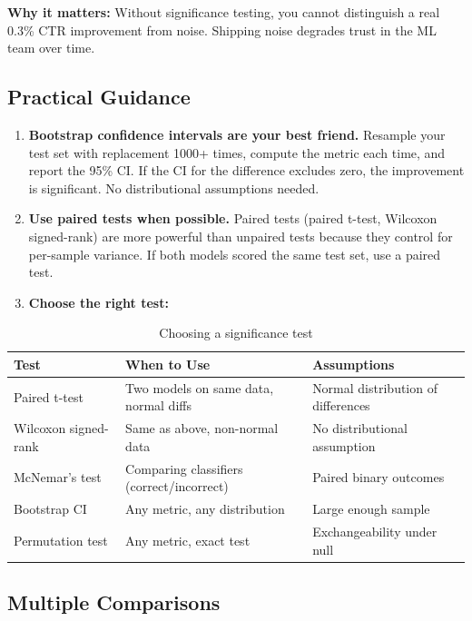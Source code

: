 \textbf{Why it matters:} Without significance testing, you cannot distinguish a real 0.3\% CTR improvement from noise. Shipping noise degrades trust in the ML team over time.

\subsection{Practical Guidance}

\begin{enumerate}
    \item \textbf{Bootstrap confidence intervals are your best friend.} Resample your test set with replacement 1000+ times, compute the metric each time, and report the 95\% CI. If the CI for the difference excludes zero, the improvement is significant. No distributional assumptions needed.

    \item \textbf{Use paired tests when possible.} Paired tests (paired t-test, Wilcoxon signed-rank) are more powerful than unpaired tests because they control for per-sample variance. If both models scored the same test set, use a paired test.

    \item \textbf{Choose the right test:}
\end{enumerate}

\begin{table}[H]
\centering
\caption{Choosing a significance test}
\begin{tabularx}{\textwidth}{lXX}
\toprule
\textbf{Test} & \textbf{When to Use} & \textbf{Assumptions} \\
\midrule
Paired t-test & Two models on same data, normal diffs & Normal distribution of differences \\
Wilcoxon signed-rank & Same as above, non-normal data & No distributional assumption \\
McNemar's test & Comparing classifiers (correct/incorrect) & Paired binary outcomes \\
Bootstrap CI & Any metric, any distribution & Large enough sample \\
Permutation test & Any metric, exact test & Exchangeability under null \\
\bottomrule
\end{tabularx}
\end{table}

\subsection{Multiple Comparisons}

